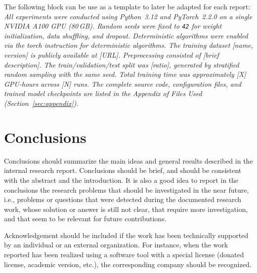 \documentclass{iteso-irr}
\begin{document}
The following block can be use as a template to later be adapted for each
report: \\ 
\textit{\noindent All experiments were conducted using Python~3.12 and PyTorch~2.2.0
on a single NVIDIA A100 GPU (80\,GB). Random seeds were fixed to
\texttt{42} for weight initialization, data shuffling, and dropout.
Deterministic algorithms were enabled via the torch instruction 
for deterministic algorithms.
The training dataset [name, version] is publicly available at [URL].
Preprocessing consisted of [brief description].
The train/validation/test split was [ratio], generated by stratified
random sampling with the same seed.
Total training time was approximately [X] GPU-hours across [N] runs.
The complete source code, configuration files, and trained model
checkpoints are listed in the Appendix of Files Used
(Section~\ref{sec:appendix}).}


\section{Conclusions}
\label{sec:conclusions}

Conclusions should summarize the main ideas and general results described
in the internal research report. Conclusions should be brief, and should
be consistent with the abstract and the introduction. It is also a good
idea to report in the conclusions the research problems that should be
investigated in the near future, i.e., problems or questions that were
detected during the documented research work, whose solution or answer is
still not clear, that require more investigation, and that seem to be
relevant for future contributions.


\label{sec:acknowledgement}

Acknowledgement should be included if the work has been technically
supported by an individual or an external organization. For instance,
when the work reported has been realized using a software tool with a
special license (donated license, academic version, etc.), the
corresponding company should be recognized.





\end{document}
